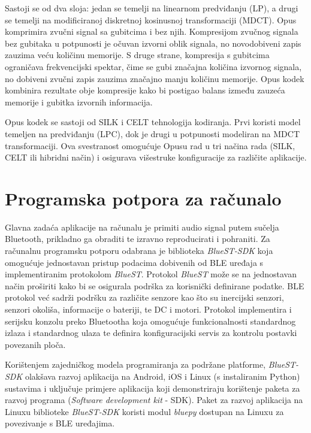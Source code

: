 Sastoji se od dva sloja: jedan se temelji na linearnom predviđanju (LP), a drugi se temelji na modificiranoj diskretnoj kosinusnoj transformaciji (MDCT). Opus komprimira zvučni signal sa gubitcima i bez njih. Kompresijom zvučnog signala bez gubitaka u potpunosti je očuvan izvorni oblik signala, no novodobiveni zapis zauzima veću količinu memorije. S druge strane, kompresija s gubitcima ograničava frekvencijski spektar, čime se gubi značajna količina izvornog signala, no dobiveni zvučni zapis zauzima značajno manju količinu memorije. Opus kodek kombinira rezultate obje kompresije kako bi postigao balans između zauzeća memorije i gubitka izvornih informacija. \cite{opus}

Opus kodek se sastoji od SILK i CELT tehnologija kodiranja. Prvi koristi model temeljen na predviđanju (LPC), dok je drugi u potpunosti modeliran na MDCT transformaciji. Ova svestranost omogućuje Opusu rad u tri načina rada (SILK, CELT ili hibridni način) i osigurava višestruke konfiguracije za različite aplikacije.

\section{Programska potpora za računalo}

Glavna zadaća aplikacije na računalu je primiti audio signal putem sučelja Bluetooth, prikladno ga obraditi te izravno reproducirati i pohraniti. Za računalnu programsku potporu odabrana je biblioteka \textit{BlueST-SDK} koja omogućuje jednostavan pristup podacima dobivenih od BLE uređaja s implementiranim protokolom \textit{BlueST}. Protokol \textit{BlueST} može se na jednostavan način proširiti kako bi se osigurala podrška za korisnički definirane podatke. BLE protokol već sadrži podršku za različite senzore kao što su inercijski senzori, senzori okoliša, informacije o bateriji, te DC i motori. Protokol implementira i serijsku konzolu preko Bluetootha koja omogućuje funkcionalnosti standardnog izlaza i standardnog ulaza te definira konfiguracijski servis za kontrolu postavki povezanih ploča. 

Korištenjem zajedničkog modela programiranja za podržane platforme, \textit{BlueST-SDK} olakšava razvoj aplikacija na Android, iOS i Linux (s instaliranim Python) sustavima i uključuje primjere aplikacija koji demonstriraju korištenje paketa za razvoj programa (\textit{Software development kit} - SDK). Paket za razvoj aplikacija na Linuxu biblioteke \textit{BlueST-SDK} koristi modul \textit{bluepy} dostupan na Linuxu za povezivanje s BLE uređajima. \cite{bluest}

